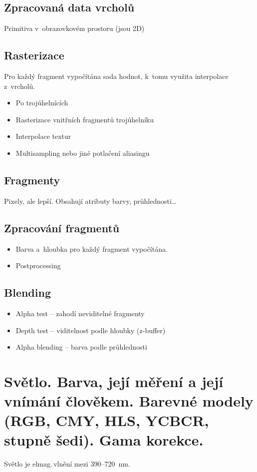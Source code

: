 \subsection{Zpracovaná data vrcholů}
Primitiva v~obrazovkovém prostoru (jsou 2D)

\subsection{Rasterizace}
Pro každý fragment vypočítána sada hodnot, k~tomu využita interpolace z~vrcholů.
\begin{itemize}
    \item Po trojúhelnících
    \item Rasterizace vnitřních fragmentů trojúhelníku
    \item Interpolace textur
    \item Multisampling nebo jiné potlačení aliasingu
\end{itemize}

\subsection{Fragmenty}
Pixely, ale lepší. Obsahují atributy barvy, průhlednosti\dots

\subsection{Zpracování fragmentů}
\begin{itemize}
    \item Barva a~hloubka pro každý fragment vypočítána.

    \item Postprocessing
\end{itemize}

\subsection{Blending}
\begin{itemize}
    \item Alpha test -- zahodí neviditelné fragmenty
    \item Depth test -- viditelnost podle hloubky (z-buffer)
    \item Alpha blending -- barva podle průhlednosti
\end{itemize}


\section{Světlo. Barva, její měření a její vnímání člověkem. Barevné modely (RGB, CMY, HLS, YCBCR, stupně šedi). Gama korekce.}
Světlo je elmag.\,vlnění mezi 390--720~nm.

